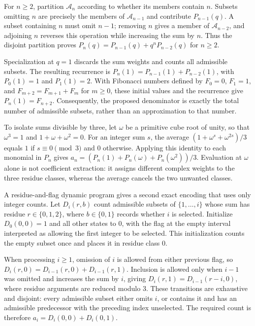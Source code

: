 \documentclass[11pt]{article}
\begin{document}
For $n\geq2$, partition $\mathcal A_n$ according to whether its members contain $n$. Subsets omitting $n$ are precisely the members of $\mathcal A_{n-1}$ and contribute $P_{n-1}(q)$. A subset containing $n$ must omit $n-1$; removing $n$ gives a member of $\mathcal A_{n-2}$, and adjoining $n$ reverses this operation while increasing the sum by $n$. Thus the disjoint partition proves $P_n(q)=P_{n-1}(q)+q^nP_{n-2}(q)$ for $n\geq2$.

Specialization at $q=1$ discards the sum weights and counts all admissible subsets. The resulting recurrence is $P_n(1)=P_{n-1}(1)+P_{n-2}(1)$, with $P_0(1)=1$ and $P_1(1)=2$. With Fibonacci numbers defined by $F_0=0$, $F_1=1$, and $F_{m+2}=F_{m+1}+F_m$ for $m\geq0$, these initial values and the recurrence give $P_n(1)=F_{n+2}$. Consequently, the proposed denominator is exactly the total number of admissible subsets, rather than an approximation to that number.

To isolate sums divisible by three, let $\omega$ be a primitive cube root of unity, so that $\omega^3=1$ and $1+\omega+\omega^2=0$. For an integer sum $s$, the average $(1+\omega^s+\omega^{2s})/3$ equals $1$ if $s\equiv0\pmod3$ and $0$ otherwise. Applying this identity to each monomial in $P_n$ gives $a_n=(P_n(1)+P_n(\omega)+P_n(\omega^2))/3$. Evaluation at $\omega$ alone is not coefficient extraction: it assigns different complex weights to the three residue classes, whereas the average cancels the two unwanted classes.

A residue-and-flag dynamic program gives a second exact encoding that uses only integer counts. Let $D_i(r,b)$ count admissible subsets of $\{1,\ldots,i\}$ whose sum has residue $r\in\{0,1,2\}$, where $b\in\{0,1\}$ records whether $i$ is selected. Initialize $D_0(0,0)=1$ and all other states to $0$, with the flag at the empty interval interpreted as allowing the first integer to be selected. This initialization counts the empty subset once and places it in residue class $0$.

When processing $i\geq1$, omission of $i$ is allowed from either previous flag, so $D_i(r,0)=D_{i-1}(r,0)+D_{i-1}(r,1)$. Inclusion is allowed only when $i-1$ was omitted and increases the sum by $i$, giving $D_i(r,1)=D_{i-1}(r-i,0)$, where residue arguments are reduced modulo $3$. These transitions are exhaustive and disjoint: every admissible subset either omits $i$, or contains it and has an admissible predecessor with the preceding index unselected. The required count is therefore $a_i=D_i(0,0)+D_i(0,1)$.
\end{document}
